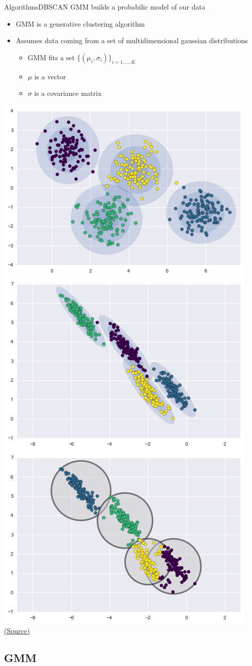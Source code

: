 \documentclass[10pt,compress]{beamer} %
\begin{document}
\begin{frame}{Algorithms}{DBSCAN}
	GMM builds a probabilic model of our data
	\begin{itemize}
		\item GMM is a generative clustering algorithm
		\item Assumes data coming from a set of multidimensional gaussian distributions
			\begin{itemize}
				\item GMM fits a set $\{(\mu_i, \sigma_i)\}_{i=1,\dots, K}$
				\item $\mu$ is a vector
				\item $\sigma$ is a covariance matrix
			\end{itemize}
	\end{itemize}

	\bigskip
	\centering \includegraphics[width=0.31\linewidth]{figs/gmm2.png}
	\includegraphics[width=0.31\linewidth]{figs/gmm3.png}
	\centering\includegraphics[width=0.31\linewidth]{figs/gmm1.png}\\
	\scriptsize\href{https://jakevdp.github.io/PythonDataScienceHandbook/05.12-gaussian-mixtures.html}{(Source)}
\end{frame}



\subsection{GMM}
\end{document}
